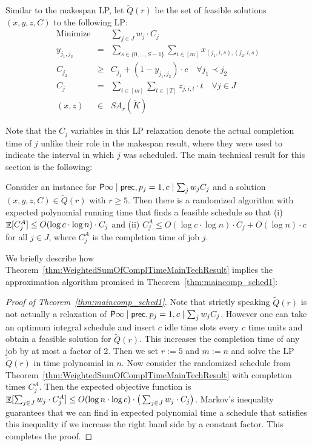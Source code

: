 Similar to the makespan LP, let $\tilde{Q}(r)$ be the set of feasible solutions  $(x,y, z,C)$ to the following LP:
\begin{eqnarray*}
\text{Minimize}  &&\sum_{j \in J} w_j \cdot C_j \\
  y_{j_1,j_2} &=& \sum_{s \in \{ 0,\ldots,S-1\}} \sum_{i \in [m]} x_{(j_1,i,s),(j_2,i,s)} \\
  C_{j_2} &\geq& C_{j_1} + (1-y_{j_1,j_2}) \cdot c \quad \forall j_1 \prec j_2 \\
  C_j &=& \sum_{i \in [m]} \sum_{t \in [T]} z_{j,i,t} \cdot t \quad \forall j \in J \\
  (x,z) &\in& SA_r(\tilde{K})
\end{eqnarray*}


Note that the $C_j$ variables in this LP relaxation denote the actual completion time of $j$ unlike their role in the makespan result, where they were used to indicate the interval in which $j$ was scheduled.
The main technical result for this section is the following:
\begin{theorem} \label{thm:WeightedSumOfComplTimeMainTechResult}
Consider an instance for $\mathsf{P} \infty \mid \mathsf{prec}, p_j=1, c \mid \sum_{j}w_j C_j$ and 
a solution $(x,y,z,C) \in \tilde{Q}(r)$ with $r \geq 5$. %
Then there is a randomized algorithm with expected polynomial running time that finds a feasible schedule so that
(i) $\mathop{\mathbb{E}}[C_j^A] \leq O(\log c \cdot \log n) \cdot C_j$ and (ii) $C_j^A \leq O(\log c \cdot \log n) \cdot C_j + O(\log n) \cdot c$ for all $j \in J$, where $C_j^A$ is the completion time of job $j$.
\end{theorem}
We briefly describe how Theorem~\ref{thm:WeightedSumOfComplTimeMainTechResult} implies the approximation algorithm
promised in Theorem~\ref{thm:maincomp_sched1}:
\begin{proof}[Proof of Theorem~\ref{thm:maincomp_sched1}]
Note that strictly speaking $\tilde{Q}(r)$ is not actually a relaxation of  $\mathsf{P} \infty \mid \mathsf{prec}, p_j=1, c \mid \sum_{j}w_j C_j$. However one can take an optimum integral schedule and insert $c$ idle time slots every $c$ time units and obtain a feasible solution for $\tilde{Q}(r)$. This increases the completion time of any job by at most a factor of 2.
Then we set $r := 5$ and $m := n$ and solve the LP $\tilde{Q}(r)$ in time polynomial in $n$.
Now consider the randomized schedule from Theorem~\ref{thm:WeightedSumOfComplTimeMainTechResult} with completion times $C_j^A$. Then the expected objective function is
 $\mathop{\mathbb{E}}[\sum_{j \in J} w_j \cdot C^A_j] \leq O(\log n \cdot \log c) \cdot \big( \sum_{j \in J} w_j \cdot C_j \big)$.
 Markov's inequality guarantees that we can find in expected polynomial time a schedule that satisfies this inequality if we increase the right hand side by a constant factor. This completes the proof.
\end{proof}




